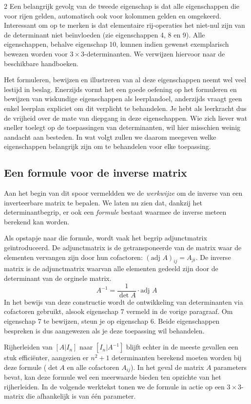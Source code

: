 \begin{multicols}{2}
Een belangrijk gevolg van de tweede eigenschap is dat alle eigenschappen die voor rijen gelden, automatisch ook voor kolommen gelden en omgekeerd. Interessant om op te merken is dat elementaire rij-operaties het niet-nul zijn van de determinant niet be\"invloeden (zie eigenschappen 4, 8 en 9). Alle eigenschappen, behalve eigenschap 10, kunnen indien gewenst exemplarisch bewezen worden voor $3\times 3$-determinanten. We verwijzen hiervoor naar de beschikbare handboeken. 

Het formuleren, bewijzen en illustreren van al deze eigenschappen neemt wel veel lestijd in beslag. Enerzijds vormt het een goede oefening op het formuleren en bewijzen van wiskundige eigenschappen als leerplandoel, anderzijds vraagt geen enkel leerplan expliciet om dit verplicht te behandelen. Je hebt als leerkracht dus de vrijheid over de mate van diepgang in deze eigenschappen. Wie zich liever wat sneller toelegt op de toepassingen van determinanten, wil hier misschien weinig aandacht aan besteden. In wat volgt zullen we daarom meegeven welke eigenschappen belangrijk zijn om te behandelen voor elke toepassing.

 \subsection{Een formule voor de inverse matrix}
Aan het begin van dit spoor vermeldden we de \emph{werkwijze} om de inverse van een inverteerbare matrix te bepalen. We laten nu zien dat, dankzij het determinantbegrip, er ook een \textit{formule} bestaat waarmee de inverse meteen berekend kan worden. 

Als opstapje naar die formule, wordt vaak het begrip adjunctmatrix ge\"introduceerd. De adjunctmatrix is de getransponeerde van de matrix waar de elementen vervangen zijn door hun cofactoren:  $(\text{adj }A)_{ij} = A_{ji}$. 
De inverse matrix is de adjunctmatrix waarvan alle elementen gedeeld zijn door de determinant van de orginele matrix.
$$A^{-1} = \frac{1}{\det A} \cdot \text{adj }A$$
In het bewijs van deze constructie wordt de ontwikkeling van determinanten via cofactoren gebruikt, alsook eigenschap 7 vermeld in de vorige paragraaf. Om eigenschap 7 te bewijzen, steun je op eigenschap 6. Beide eigenschappen bespreken is dus aangewezen als je deze toepassing wil behandelen. 

Rijherleiden van $[A|I_n]$ naar $[I_n|A^{-1}]$ blijft echter in de meeste gevallen een stuk effici\"enter, aangezien er $n^2+1$ determinanten berekend moeten worden bij deze formule ($\det A$ en alle cofactoren $A_{ij}$). In het geval de matrix $A$ parameters bevat, kan deze formule wel een meerwaarde bieden ten opzichte van het rijherleiden. In de volgende werktekst tonen we de formule in actie op een $3\times 3$-matrix die afhankelijk is van \'e\'en parameter. 
\ \\
\end{multicols}
